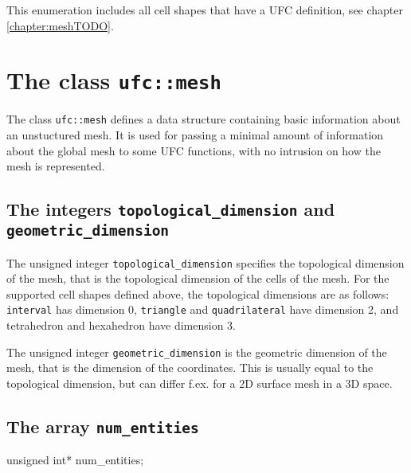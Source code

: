 This enumeration includes all cell shapes that have a UFC definition, see chapter \ref{chapter:meshTODO}.


\section{The class \texttt{ufc::mesh}}

The class \texttt{ufc::mesh} defines a data structure containing basic information about
an unstuctured mesh. It is used for passing a minimal amount of information about the
global mesh to some UFC functions, with no intrusion on how the mesh is represented.

\subsection{The integers \texttt{topological\_dimension} and \texttt{geometric\_dimension}}


The unsigned integer \texttt{topological\_dimension}
specifies the topological dimension of the mesh, that is the
topological dimension of the cells of the mesh. For the supported
cell shapes defined above, the topological dimensions are as follows:
\texttt{interval} has dimension 0, \texttt{triangle} and
\texttt{quadrilateral} have dimension 2, and tetrahedron and
hexahedron have dimension 3.


The unsigned integer \texttt{geometric\_dimension} is the geometric dimension
of the mesh, that is the dimension of the coordinates.
This is usually equal to the topological dimension, but can differ f.ex. for
a 2D surface mesh in a 3D space.

\subsection{The array \texttt{num\_entities}}


\begin{code}
unsigned int* num_entities;
\end{code}


